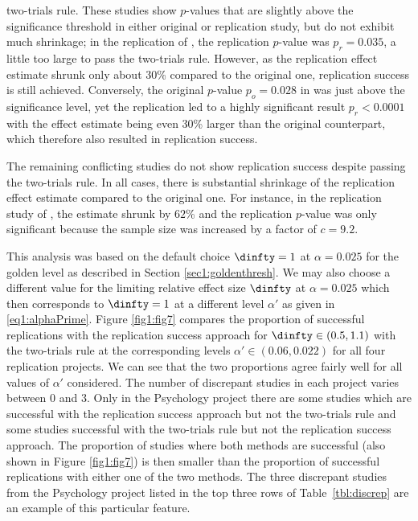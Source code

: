 two-trials rule. These studies show $p$-values that are slightly above the
significance threshold in either original or replication study, but do not
exhibit much shrinkage; in the replication of \citet{Oberauer2008}, the
replication $p$-value was $p_r = 0.035$, a little too large to pass the
two-trials rule. However, as the replication effect estimate shrunk only about
$30$\% compared to the original one, replication success is still achieved.
Conversely, the original $p$-value $p_o = 0.028$ in \citet{Schmidt2008} was just
above the significance level, yet the replication led to a highly significant
result $p_r < 0.0001$ with the effect estimate being even $30$\% larger than the
original counterpart, which therefore also resulted in replication success.

The remaining conflicting studies do not show replication success despite
passing the two-trials rule. In all cases, there is substantial shrinkage of the
replication effect estimate compared to the original one. For instance, in the
replication study of \citet{Pyc2010}, the estimate shrunk by $62$\% and the
replication $p$-value was only significant because the sample size was increased
by a factor of $c = 9.2$.



This analysis was based on the default choice $\dinfty=1$ at $\alpha=0.025$ for
the golden level as described in Section \ref{sec1:goldenthresh}. We may also
choose a different value for the limiting relative effect size $\dinfty$ at
$\alpha=0.025$ which then corresponds to $\dinfty=1$ at a different level
$\alpha'$ as given in \eqref{eq1:alphaPrime}. Figure \ref{fig1:fig7} compares the
proportion of successful replications with the replication success approach for
$\dinfty \in (0.5, 1.1)$ with the two-trials rule at the
corresponding levels
$\alpha' \in (0.06, 0.022)$ for
all four replication projects. We can see that the two proportions agree fairly
well for all values of $\alpha'$ considered. The number of discrepant studies in
each project varies between 0 and 3. Only in the Psychology project there are
some studies which are successful with the replication success approach but not
the two-trials rule and some studies successful with the two-trials rule but not
the replication success approach. The proportion of studies where both methods
are successful (also shown in Figure \ref{fig1:fig7}) is then smaller than the
proportion of successful replications with either one of the two methods. The
three discrepant studies from the Psychology project listed in the top three
rows of Table~\ref{tbl:discrep} are an example of this particular feature.

